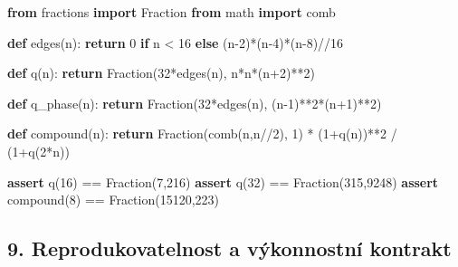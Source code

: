 \documentclass[
  10pt,
]{article}
\newenvironment{Shaded}{}{}
\newcommand{\ControlFlowTok}[1]{\textcolor[rgb]{0.00,0.44,0.13}{\textbf{#1}}}
\newcommand{\DecValTok}[1]{\textcolor[rgb]{0.25,0.63,0.44}{#1}}
\newcommand{\ImportTok}[1]{\textcolor[rgb]{0.00,0.50,0.00}{\textbf{#1}}}
\newcommand{\KeywordTok}[1]{\textcolor[rgb]{0.00,0.44,0.13}{\textbf{#1}}}
\newcommand{\NormalTok}[1]{#1}
\newcommand{\OperatorTok}[1]{\textcolor[rgb]{0.40,0.40,0.40}{#1}}
\begin{document}
\begin{Shaded}
\begin{Highlighting}[]
\ImportTok{from}\NormalTok{ fractions }\ImportTok{import}\NormalTok{ Fraction}
\ImportTok{from}\NormalTok{ math }\ImportTok{import}\NormalTok{ comb}

\KeywordTok{def}\NormalTok{ edges(n):}
    \ControlFlowTok{return} \DecValTok{0} \ControlFlowTok{if}\NormalTok{ n }\OperatorTok{\textless{}} \DecValTok{16} \ControlFlowTok{else}\NormalTok{ (n}\OperatorTok{{-}}\DecValTok{2}\NormalTok{)}\OperatorTok{*}\NormalTok{(n}\OperatorTok{{-}}\DecValTok{4}\NormalTok{)}\OperatorTok{*}\NormalTok{(n}\OperatorTok{{-}}\DecValTok{8}\NormalTok{)}\OperatorTok{//}\DecValTok{16}

\KeywordTok{def}\NormalTok{ q(n):}
    \ControlFlowTok{return}\NormalTok{ Fraction(}\DecValTok{32}\OperatorTok{*}\NormalTok{edges(n), n}\OperatorTok{*}\NormalTok{n}\OperatorTok{*}\NormalTok{(n}\OperatorTok{+}\DecValTok{2}\NormalTok{)}\OperatorTok{**}\DecValTok{2}\NormalTok{)}

\KeywordTok{def}\NormalTok{ q\_phase(n):}
    \ControlFlowTok{return}\NormalTok{ Fraction(}\DecValTok{32}\OperatorTok{*}\NormalTok{edges(n), (n}\OperatorTok{{-}}\DecValTok{1}\NormalTok{)}\OperatorTok{**}\DecValTok{2}\OperatorTok{*}\NormalTok{(n}\OperatorTok{+}\DecValTok{1}\NormalTok{)}\OperatorTok{**}\DecValTok{2}\NormalTok{)}

\KeywordTok{def}\NormalTok{ compound(n):}
    \ControlFlowTok{return}\NormalTok{ Fraction(comb(n,n}\OperatorTok{//}\DecValTok{2}\NormalTok{), }\DecValTok{1}\NormalTok{) }\OperatorTok{*}\NormalTok{ (}\DecValTok{1}\OperatorTok{+}\NormalTok{q(n))}\OperatorTok{**}\DecValTok{2} \OperatorTok{/}\NormalTok{ (}\DecValTok{1}\OperatorTok{+}\NormalTok{q(}\DecValTok{2}\OperatorTok{*}\NormalTok{n))}

\ControlFlowTok{assert}\NormalTok{ q(}\DecValTok{16}\NormalTok{) }\OperatorTok{==}\NormalTok{ Fraction(}\DecValTok{7}\NormalTok{,}\DecValTok{216}\NormalTok{)}
\ControlFlowTok{assert}\NormalTok{ q(}\DecValTok{32}\NormalTok{) }\OperatorTok{==}\NormalTok{ Fraction(}\DecValTok{315}\NormalTok{,}\DecValTok{9248}\NormalTok{)}
\ControlFlowTok{assert}\NormalTok{ compound(}\DecValTok{8}\NormalTok{) }\OperatorTok{==}\NormalTok{ Fraction(}\DecValTok{15120}\NormalTok{,}\DecValTok{223}\NormalTok{)}
\end{Highlighting}
\end{Shaded}

\subsection{9. Reprodukovatelnost a výkonnostní
kontrakt}\label{reprodukovatelnost-a-vuxfdkonnostnuxed-kontrakt}
\end{document}
